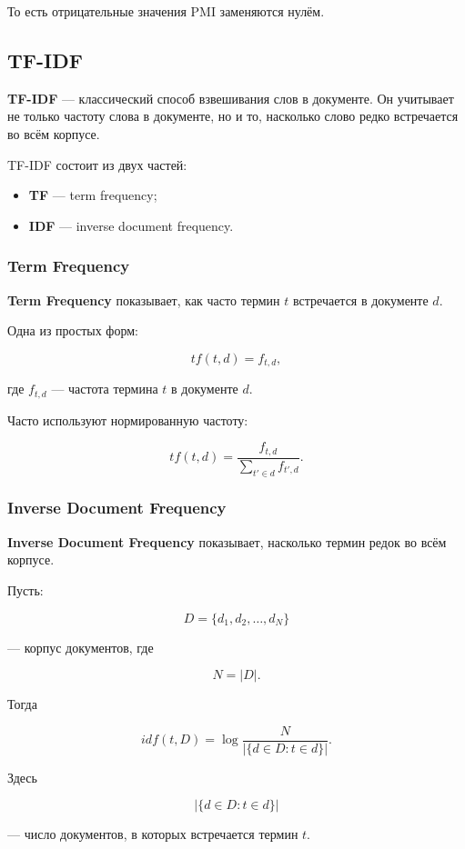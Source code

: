 \documentclass[a4paper,12pt]{article}
\begin{document}
То есть отрицательные значения PMI заменяются нулём.

\subsection{TF-IDF}

\textbf{TF-IDF} --- классический способ взвешивания слов в документе. Он учитывает не только частоту слова в документе, но и то, насколько слово редко встречается во всём корпусе.

TF-IDF состоит из двух частей:

\begin{itemize}
    \item \textbf{TF} --- term frequency;
    \item \textbf{IDF} --- inverse document frequency.
\end{itemize}

\subsubsection{Term Frequency}

\textbf{Term Frequency} показывает, как часто термин \(t\) встречается в документе \(d\).

Одна из простых форм:

\[
tf(t,d) = f_{t,d},
\]

где \(f_{t,d}\) --- частота термина \(t\) в документе \(d\).

Часто используют нормированную частоту:

\[
tf(t,d) = \frac{f_{t,d}}{\sum_{t' \in d} f_{t',d}}.
\]

\subsubsection{Inverse Document Frequency}

\textbf{Inverse Document Frequency} показывает, насколько термин редок во всём корпусе.

Пусть:

\[
D = \{d_1, d_2, \dots, d_N\}
\]

--- корпус документов, где

\[
N = |D|.
\]

Тогда

\[
idf(t,D)
=
\log
\frac{N}
{|\{d \in D : t \in d\}|}.
\]

Здесь

\[
|\{d \in D : t \in d\}|
\]

--- число документов, в которых встречается термин \(t\).
\end{document}
